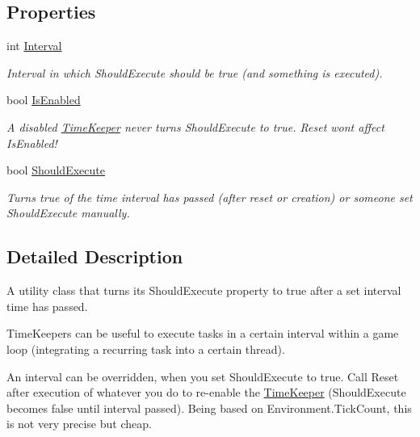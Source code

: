 \subsection*{Properties}
\begin{DoxyCompactItemize}
\item 
int \hyperlink{class_exit_games_1_1_client_1_1_demo_particle_1_1_time_keeper_af643245f13169287f51e2df2f5b18758}{Interval}
\begin{DoxyCompactList}\small\item\em Interval in which Should\+Execute should be true (and something is executed).\end{DoxyCompactList}\item 
bool \hyperlink{class_exit_games_1_1_client_1_1_demo_particle_1_1_time_keeper_ad1d37a796623b211b4b98867bb3ac5bf}{Is\+Enabled}
\begin{DoxyCompactList}\small\item\em A disabled \hyperlink{class_exit_games_1_1_client_1_1_demo_particle_1_1_time_keeper}{Time\+Keeper} never turns Should\+Execute to true. Reset won\textquotesingle{}t affect Is\+Enabled!\end{DoxyCompactList}\item 
bool \hyperlink{class_exit_games_1_1_client_1_1_demo_particle_1_1_time_keeper_aa448c3addb4ded8b0226be09bed5982c}{Should\+Execute}
\begin{DoxyCompactList}\small\item\em Turns true of the time interval has passed (after reset or creation) or someone set Should\+Execute manually. \end{DoxyCompactList}\end{DoxyCompactItemize}


\subsection{Detailed Description}
A utility class that turns it\textquotesingle{}s Should\+Execute property to true after a set interval time has passed. 

Time\+Keepers can be useful to execute tasks in a certain interval within a game loop (integrating a recurring task into a certain thread).

An interval can be overridden, when you set Should\+Execute to true. Call Reset after execution of whatever you do to re-\/enable the \hyperlink{class_exit_games_1_1_client_1_1_demo_particle_1_1_time_keeper}{Time\+Keeper} (Should\+Execute becomes false until interval passed). Being based on Environment.\+Tick\+Count, this is not very precise but cheap. 

